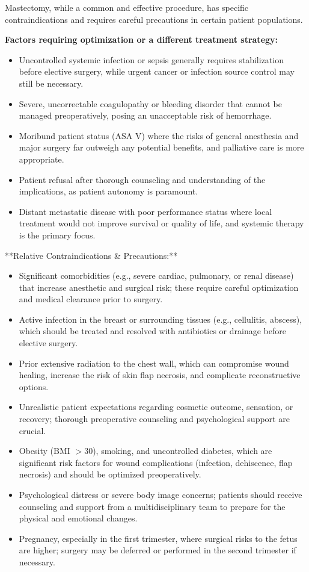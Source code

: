 Mastectomy, while a common and effective procedure, has specific contraindications and requires careful precautions in certain patient populations.

\textbf{Factors requiring optimization or a different treatment strategy:}
\begin{itemize}
  \item Uncontrolled systemic infection or sepsis generally requires stabilization before elective surgery, while urgent cancer or infection source control may still be necessary.
  \item Severe, uncorrectable coagulopathy or bleeding disorder that cannot be managed preoperatively, posing an unacceptable risk of hemorrhage.
  \item Moribund patient status (ASA V) where the risks of general anesthesia and major surgery far outweigh any potential benefits, and palliative care is more appropriate.
  \item Patient refusal after thorough counseling and understanding of the implications, as patient autonomy is paramount.
\item Distant metastatic disease with poor performance status where local treatment would not improve survival or quality of life, and systemic therapy is the primary focus.
\end{itemize}

**Relative Contraindications \& Precautions:**
\begin{itemize}
  \item Significant comorbidities (e.g., severe cardiac, pulmonary, or renal disease) that increase anesthetic and surgical risk; these require careful optimization and medical clearance prior to surgery.
  \item Active infection in the breast or surrounding tissues (e.g., cellulitis, abscess), which should be treated and resolved with antibiotics or drainage before elective surgery.
  \item Prior extensive radiation to the chest wall, which can compromise wound healing, increase the risk of skin flap necrosis, and complicate reconstructive options.
  \item Unrealistic patient expectations regarding cosmetic outcome, sensation, or recovery; thorough preoperative counseling and psychological support are crucial.
  \item Obesity (BMI $>$30), smoking, and uncontrolled diabetes, which are significant risk factors for wound complications (infection, dehiscence, flap necrosis) and should be optimized preoperatively.
  \item Psychological distress or severe body image concerns; patients should receive counseling and support from a multidisciplinary team to prepare for the physical and emotional changes.
  \item Pregnancy, especially in the first trimester, where surgical risks to the fetus are higher; surgery may be deferred or performed in the second trimester if necessary.
\end{itemize}

